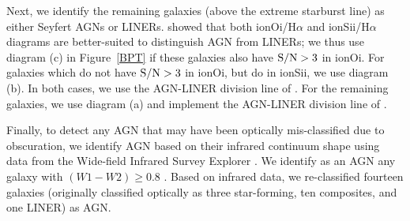 Next, we identify the remaining galaxies (above the extreme starburst line) as either Seyfert AGNs or LINERs. \citet{Kewley06} showed that both ion{O}{i}/H$\alpha$ and  ion{S}{ii}/H$\alpha$ diagrams are better-suited to distinguish AGN from LINERs; we thus use diagram (c) in Figure~\ref{BPT} if these galaxies also have $\rm S/N>3$ in ion{O}{i}. For galaxies which do not have $\rm S/N>3$ in ion{O}{i}, but do in ion{S}{ii}, we use diagram (b). In both cases, we use the AGN-LINER division line of \citet{Kewley06}. For the remaining galaxies, we use diagram (a) and implement the AGN-LINER division line of \citet{Ski07}.

Finally, to detect any AGN that may have been optically mis-classified due to obscuration, we identify AGN based on their infrared continuum shape using data from the Wide-field Infrared Survey Explorer \citep[WISE]{WISE}. We identify as an AGN any galaxy with $(W1-W2) \ge 0.8$ \citep{Stern12}. Based on infrared data, we re-classified fourteen galaxies (originally classified optically as three star-forming, ten composites, and one LINER) as AGN. 

